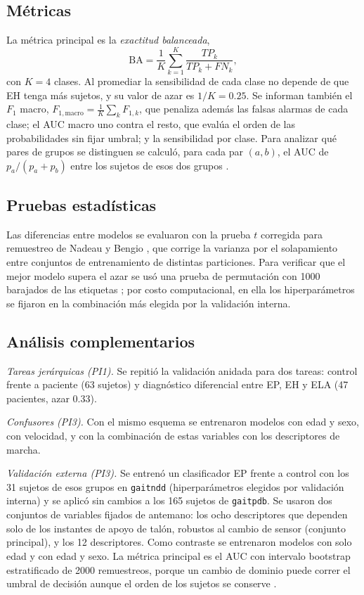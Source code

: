 \documentclass[conference]{IEEEtran}
\newcommand{\gaitndd}{\texttt{gaitndd}}
\newcommand{\gaitpdb}{\texttt{gaitpdb}}
\begin{document}
\subsection{Métricas}
La métrica principal es la \textit{exactitud balanceada},
\begin{equation}
\mathrm{BA} = \frac{1}{K}\sum_{k=1}^{K}\frac{TP_k}{TP_k+FN_k},
\label{eq:ba}
\end{equation}
con $K=4$ clases. Al promediar la sensibilidad de cada clase no depende de que EH tenga más sujetos, y su valor de azar es $1/K = 0.25$. Se informan también el $F_1$ macro, $F_{1,\mathrm{macro}} = \frac{1}{K}\sum_k F_{1,k}$, que penaliza además las falsas alarmas de cada clase; el AUC macro uno contra el resto, que evalúa el orden de las probabilidades sin fijar umbral; y la sensibilidad por clase. Para analizar qué pares de grupos se distinguen se calculó, para cada par $(a, b)$, el AUC de $p_a/(p_a+p_b)$ entre los sujetos de esos dos grupos \cite{hand2001}.

\subsection{Pruebas estadísticas}
Las diferencias entre modelos se evaluaron con la prueba $t$ corregida para remuestreo de Nadeau y Bengio \cite{nadeau2003}, que corrige la varianza por el solapamiento entre conjuntos de entrenamiento de distintas particiones. Para verificar que el mejor modelo supera el azar se usó una prueba de permutación con 1000 barajados de las etiquetas \cite{ojala2010}; por costo computacional, en ella los hiperparámetros se fijaron en la combinación más elegida por la validación interna.

\subsection{Análisis complementarios}
\textit{Tareas jerárquicas (PI1).} Se repitió la validación anidada para dos tareas: control frente a paciente (63 sujetos) y diagnóstico diferencial entre EP, EH y ELA (47 pacientes, azar 0.33).

\textit{Confusores (PI3).} Con el mismo esquema se entrenaron modelos con edad y sexo, con velocidad, y con la combinación de estas variables con los descriptores de marcha.

\textit{Validación externa (PI3).} Se entrenó un clasificador EP frente a control con los 31 sujetos de esos grupos en \gaitndd{} (hiperparámetros elegidos por validación interna) y se aplicó sin cambios a los 165 sujetos de \gaitpdb. Se usaron dos conjuntos de variables fijados de antemano: los ocho descriptores que dependen solo de los instantes de apoyo de talón, robustos al cambio de sensor (conjunto principal), y los 12 descriptores. Como contraste se entrenaron modelos con solo edad y con edad y sexo. La métrica principal es el AUC con intervalo bootstrap estratificado de 2000 remuestreos, porque un cambio de dominio puede correr el umbral de decisión aunque el orden de los sujetos se conserve \cite{collins2015}.
\end{document}
